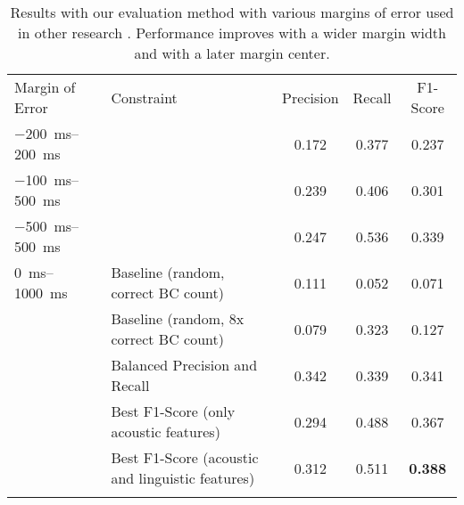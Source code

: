 \begin{table}
    \centering
    \begin{tabular}{p{3.4cm}p{5.5cm}ccc}
    \hline\noalign{\smallskip}
        Margin of Error & Constraint & Precision & Recall & F1-Score \\
        \noalign{\smallskip}\svhline\noalign{\smallskip}
        \SIrange{-200}{200}{ms} && 0.172 & 0.377 & 0.237 \\
        \SIrange{-100}{500}{ms} &&	0.239 & 0.406 & 0.301 \\
        \SIrange{-500}{500}{ms} && 0.247 & 0.536 & 0.339 \\
    \hline\noalign{\smallskip}
        \SIrange{0}{1000}{ms} & Baseline \newline (random, correct BC count) & 0.111 & 0.052 & 0.071 \\
         & Baseline \newline (random, 8x correct BC count) & 0.079 & 0.323 & 0.127 \\
         & Balanced Precision and Recall & 0.342 & 0.339 & 0.341 \\
         & Best F1-Score \newline (only acoustic features) & 0.294 & 0.488 & 0.367 \\
         & Best F1-Score (acoustic and linguistic features) & 0.312 & 0.511 & \bf{0.388} \\
    \noalign{\smallskip}\hline\noalign{\smallskip}
    \end{tabular}
    \caption{Results with our evaluation method with various margins of error used in other research \cite{de_kok_survey_2012}. Performance improves with a wider margin width and with a later margin center.\label{tbl:ourbest}}
\end{table}
